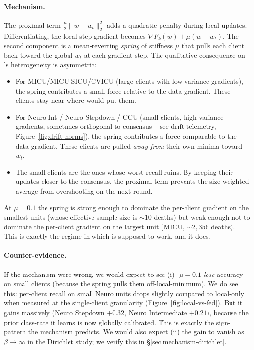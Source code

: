 \paragraph{Mechanism.} The proximal term $\frac{\mu}{2}\|w - w_t\|_2^2$ adds a
quadratic penalty during local updates. Differentiating, the local-step gradient
becomes $\nabla F_k(w) + \mu(w - w_t)$. The second component is a mean-reverting
\emph{spring} of stiffness $\mu$ that pulls each client back toward the global
$w_t$ at each gradient step. The qualitative consequence on \mimic{}'s
heterogeneity is asymmetric:
\begin{itemize}[leftmargin=*,nosep]
    \item For MICU/MICU-SICU/CVICU (large clients with low-variance gradients),
        the spring contributes a small force relative to the data gradient.
        These clients stay near where \fedavg{} would put them.
    \item For Neuro Int / Neuro Stepdown / CCU (small clients, high-variance
        gradients, sometimes orthogonal to consensus -- see drift telemetry,
        Figure~\ref{fig:drift-norms}), the spring contributes a force comparable
        to the data gradient. These clients are pulled \emph{away from} their
        own minima toward $w_t$.
    \item The small clients are the ones whose worst-recall \fedavg{} ruins. By
        keeping their updates closer to the consensus, the proximal term
        prevents the size-weighted average from overshooting on the next round.
\end{itemize}
At $\mu \!=\! 0.1$ the spring is strong enough to dominate the per-client
gradient on the smallest units (whose effective sample size is $\sim$$10$
deaths) but weak enough not to dominate the per-client gradient on the largest
unit (MICU, $\sim$$2{,}356$ deaths). This is exactly the regime in which
\fedprox{} is supposed to work, and it does.

\paragraph{Counter-evidence.} If the mechanism were wrong, we would expect to
see (i) \fedprox{}-$\mu\!=\!0.1$ \emph{lose} accuracy on small clients (because
the spring pulls them off-local-minimum). We do see this: per-client recall on
small Neuro units drops slightly compared to local-only when measured at the
single-client granularity (Figure~\ref{fig:local-vs-fed}). But it gains
\auprc{} massively (Neuro Stepdown $+0.32$, Neuro Intermediate $+0.21$),
because the prior class-rate it learns is now globally calibrated.
This is exactly the sign-pattern the mechanism predicts. We would also expect
(ii) the gain to vanish as $\beta \!\to\! \infty$ in the Dirichlet study; we
verify this in \S\ref{sec:mechanism-dirichlet}.

